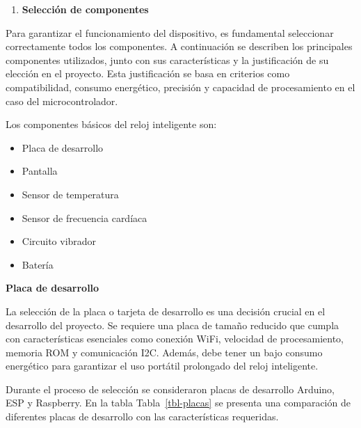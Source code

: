 \documentclass[
  12pt,
  letterpaper,
  DIV=11,
  numbers=noendperiod]{scrreport}
\providecommand{\tightlist}{%
  \setlength{\itemsep}{0pt}\setlength{\parskip}{0pt}}\usepackage{longtable,booktabs,array}
\begin{document}
\begin{enumerate}
\def\labelenumi{\arabic{enumi}.}
\setcounter{enumi}{1}
\tightlist
\item
  \textbf{Selección de componentes}
\end{enumerate}

Para garantizar el funcionamiento del dispositivo, es fundamental
seleccionar correctamente todos los componentes. A continuación se
describen los principales componentes utilizados, junto con sus
características y la justificación de su elección en el proyecto. Esta
justificación se basa en criterios como compatibilidad, consumo
energético, precisión y capacidad de procesamiento en el caso del
microcontrolador.

Los componentes básicos del reloj inteligente son:

\begin{itemize}
\tightlist
\item
  Placa de desarrollo
\item
  Pantalla
\item
  Sensor de temperatura
\item
  Sensor de frecuencia cardíaca
\item
  Circuito vibrador
\item
  Batería
\end{itemize}

\textbf{Placa de desarrollo}

La selección de la placa o tarjeta de desarrollo es una decisión crucial
en el desarrollo del proyecto. Se requiere una placa de tamaño reducido
que cumpla con características esenciales como conexión WiFi, velocidad
de procesamiento, memoria ROM y comunicación I2C. Además, debe tener un
bajo consumo energético para garantizar el uso portátil prolongado del
reloj inteligente.

Durante el proceso de selección se consideraron placas de desarrollo
Arduino, ESP y Raspberry. En la tabla Tabla~\ref{tbl-placas} se presenta
una comparación de diferentes placas de desarrollo con las
características requeridas.
\end{document}
